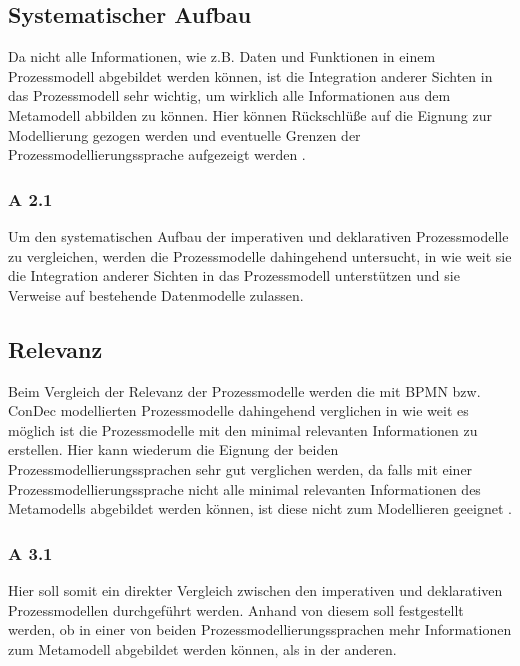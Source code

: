\subsection{Systematischer Aufbau}

 Da nicht alle Informationen, wie z.B. Daten und Funktionen in einem Prozessmodell abgebildet werden können, ist die Integration anderer Sichten in das Prozessmodell sehr wichtig, um wirklich alle Informationen aus dem Metamodell abbilden zu können. Hier können Rückschlüße auf die Eignung zur Modellierung gezogen werden und eventuelle Grenzen der Prozessmodellierungssprache aufgezeigt werden \cite{journals95, freund2007, becker2012prozessmanagement,koch2011}.


\subsubsection{A 2.1}
Um den systematischen Aufbau der imperativen und deklarativen Prozessmodelle zu vergleichen, werden die Prozessmodelle dahingehend untersucht, in wie weit sie die Integration anderer Sichten in das Prozessmodell unterstützen und sie Verweise auf bestehende Datenmodelle zulassen. 

\subsection{Relevanz}

Beim Vergleich der Relevanz der Prozessmodelle werden die mit BPMN bzw. ConDec modellierten Prozessmodelle dahingehend verglichen in wie weit es möglich ist die Prozessmodelle mit den minimal relevanten Informationen zu erstellen. Hier kann wiederum die Eignung der beiden Prozessmodellierungssprachen sehr gut verglichen werden, da falls mit einer Prozessmodellierungssprache nicht alle minimal relevanten Informationen des Metamodells abgebildet werden können, ist diese nicht zum Modellieren geeignet \cite{journals95, freund2007,reinshagen2009}. 

\subsubsection{A 3.1}

Hier soll somit ein direkter Vergleich zwischen den imperativen und deklarativen Prozessmodellen durchgeführt werden. Anhand von diesem soll festgestellt werden, ob in einer von beiden Prozessmodellierungssprachen mehr Informationen zum Metamodell abgebildet werden können, als in der anderen.\newline

